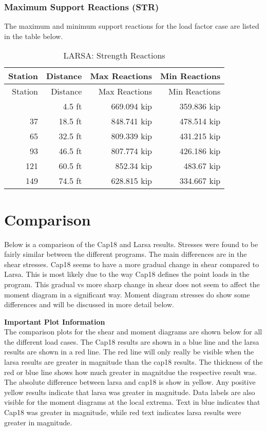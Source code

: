 \documentclass[
  letterpaper,
  DIV=11,
  numbers=noendperiod]{scrartcl}
\begin{document}
\subsubsection{Maximum Support Reactions
(STR)}\label{maximum-support-reactions-str-1}

The maximum and minimum support reactions for the load factor case are
listed in the table below.

\begin{longtable}[]{@{}rrrr@{}}
\caption{LARSA: Strength Reactions}\tabularnewline
\toprule\noalign{}
Station & Distance & Max Reactions & Min Reactions \\
\midrule\noalign{}
\endfirsthead
\toprule\noalign{}
Station & Distance & Max Reactions & Min Reactions \\
\midrule\noalign{}
\endhead
\bottomrule\noalign{}
\endlastfoot
9 & 4.5 ft & 669.094 kip & 359.836 kip \\
37 & 18.5 ft & 848.741 kip & 478.514 kip \\
65 & 32.5 ft & 809.339 kip & 431.215 kip \\
93 & 46.5 ft & 807.774 kip & 426.186 kip \\
121 & 60.5 ft & 852.34 kip & 483.67 kip \\
149 & 74.5 ft & 628.815 kip & 334.667 kip \\
\end{longtable}

\newpage{}

\section{Comparison}\label{comparison}

Below is a comparison of the Cap18 and Larsa results. Stresses were
found to be fairly similar between the different programs. The main
differences are in the shear stresses. Cap18 seems to have a more
gradual change in shear compared to Larsa. This is most likely due to
the way Cap18 defines the point loads in the program. This gradual vs
more sharp change in shear does not seem to affect the moment diagram in
a significant way. Moment diagram stresses do show some differences and
will be discussed in more detail below.

\textbf{Important Plot Information}\\
The comparison plots for the shear and moment diagrams are shown below
for all the different load cases. The Cap18 results are shown in a blue
line and the larsa results are shown in a red line. The red line will
only really be visible when the larsa results are greater in magnitude
than the cap18 results. The thickness of the red or blue line shows how
much greater in magnitdue the respective result was. The absolute
difference between larsa and cap18 is show in yellow. Any positive
yellow results indicate that larsa was greater in magnitude. Data labels
are also visible for the moment diagrams at the local extrema. Text in
blue indicates that Cap18 was greater in magnitude, while red text
indicates larsa results were greater in magnitude.
\end{document}
